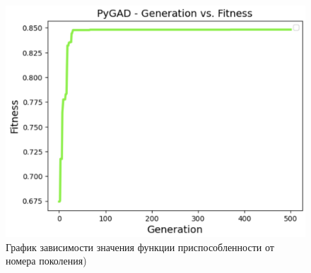 \begin{figure}
	\begin{center}
		\includegraphics[width=\textwidth]{images/4.png}
	\end{center}
	\caption{График зависимости значения функции приспособленности от номера поколения)}
	\label{img:4}
\end{figure}

\clearpage
